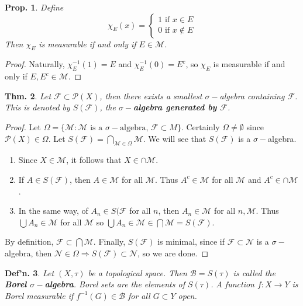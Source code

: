 \documentclass[12pt, a4paper]{book}
\newtheorem{theorem}{Thm.}[section]
\newtheorem{definition}[theorem]{Def'n.}
\newtheorem{proposition}[theorem]{Prop.}
\theoremstyle{nonumberplain}
\newtheorem{proof}{Proof}
\begin{document}
\begin{proposition}
    Define
    \[\chi_E(x)=
        \begin{cases}
            1\text{ if }x\in E\\
            0\text{ if }x\notin E
        \end{cases}
    \]
    Then $\chi_E$ is measurable if and only if $E\in\mathcal{M}$.
\end{proposition}
\begin{proof}
    Naturally, $\chi_E^{-1}(1)=E$ and $\chi_E^{-1}(0)=E^c$, so $\chi_E$ is measurable if and only if $E,E^c\in\mathcal{M}$.
\end{proof}
\begin{theorem}
    Let $\mathcal{F}\subset\mathcal{P}(X)$, then there exists a smallest $\sigma-$algebra containing $\mathcal{F}$.
    This is denoted by $S(\mathcal{F})$, the \textbf{$\sigma-$algebra generated by $\mathcal{F}$}.
\end{theorem}
\begin{proof}
    Let $\Omega=\{\mathcal{M}:\mathcal{M}\text{ is a $\sigma-$algebra, }\mathcal{F}\subset M\}$.
    Certainly $\Omega\neq\emptyset$ since $\mathcal{P}(X)\in\Omega$.
    Let $S(\mathcal{F})=\bigcap_{\mathcal{M}\in\Omega}\mathcal{M}$.
    We will see that $S(\mathcal{F})$ is a $\sigma-$algebra.
    \begin{enumerate}[label=(\roman*),nolistsep]
        \item Since $X\in\mathcal{M}$, it follows that $X\in\cap\mathcal{M}$.
        \item If $A\in S(\mathcal{F})$, then $A\in\mathcal{M}$ for all $\mathcal{M}$.
            Thus $A^c\in\mathcal{M}$ for all $\mathcal{M}$ and $A^c\in\cap\mathcal{M}$.
        \item In the same way, of $A_n\in S(\mathcal{F}$ for all $n$, then $A_n\in\mathcal{M}$ for all $n,\mathcal{M}$.
            Thus $\bigcup A_n\in\mathcal{M}$ for all $\mathcal{M}$ so $\bigcup A_n\in\mathcal{M}\in \bigcap \mathcal{M}=S(\mathcal{F})$.
    \end{enumerate}
    By definition, $\mathcal{F}\subset\bigcap\mathcal{M}$.
    Finally, $S(\mathcal{F})$ is minimal, since if $\mathcal{F}\subset\mathcal{N}$ is a $\sigma-$algebra, then $\mathcal{N}\in\Omega\Rightarrow S(\mathcal{F})\subset\mathcal{N}$, so we are done.
\end{proof}
\begin{definition}
    Let $(X,\tau)$ be a topological space.
    Then $\mathcal{B}=S(\tau)$ is called the \textbf{Borel $\sigma-$algebra}.
    Borel sets are the elements of $S(\tau)$.
    A function $f:X\to Y$ is Borel measurable if $f^{-1}(G)\in\mathcal{B}$ for all $G\subset Y$ open.
\end{definition}
\end{document}
